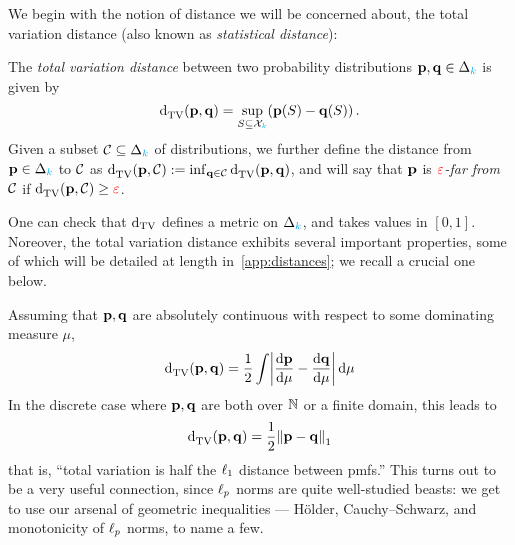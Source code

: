 We begin with the notion of distance we will be concerned about, the total variation distance (also known as \emph{statistical distance}):
\begin{definition}
  \label{def:tv}
  The \emph{total variation distance} between two probability distributions $\p,\q\in\distribs{\ab}$ is given by
  \[
    \totalvardist{\p}{\q} = \sup_{S\subseteq \domain_\ab} (\p(S)-\q(S))\,.
  \]
  Given a subset $\class\subseteq\distribs{\ab}$ of distributions, we further define the distance from $\p\in\distribs{\ab}$ to $\class$ as $\totalvardist{\p}{\class} \eqdef \inf_{\q\in\class} \totalvardist{\p}{\q}$, and will say that $\p$ is \emph{$\dst$-far from $\class$} if $\totalvardist{\p}{\class}\geq \dst$.
\end{definition}
One can check that $\dtv$ defines a metric on $\distribs{\ab}$, and takes values in $[0,1]$. Noreover, the total variation distance exhibits several important properties, some of which will be detailed at length in~\cref{app:distances}; we recall a crucial one below. 

Assuming that $\p,\q$ are absolutely continuous with respect to some dominating measure $\mu$,
  \begin{equation}
    \totalvardist{\p}{\q} = \frac{1}{2}\int \abs{\dv{\p}{\mu}-\dv{\q}{\mu}}\dd{\mu}
  \end{equation}
  In the discrete case where $\p,\q$ are both over $\N$ or a finite domain, this leads to
  \begin{equation}
    \label{eq:tv:l1}
    \totalvardist{\p}{\q} = \frac{1}{2}\normone{\p-\q}
  \end{equation}
  that is, ``total variation is half the $\lp[1]$ distance between pmfs.'' This turns out to be a very useful connection, since $\lp[p]$ norms are quite well-studied beasts: we get to use our arsenal of geometric inequalities --- H\"older, Cauchy--Schwarz, and monotonicity of $\lp[p]$ norms, to name a few.\smallskip

